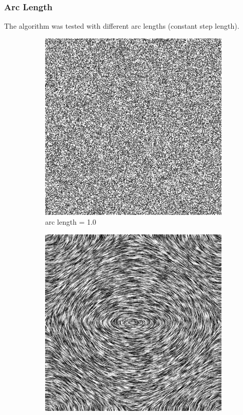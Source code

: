\documentclass{article}
\begin{document}
\subsubsection{Arc Length}
The algorithm was tested with different arc lengths (constant step length).
\begin{figure}[h!]
    \centering
    \begin{subfigure}{0.30\textwidth}
        \centering
        \includegraphics[width=\textwidth]{lic_metsim_arc_1.png}
        \caption{arc length = 1.0}
    \end{subfigure}
    \hfill
    \begin{subfigure}{0.30\textwidth}
        \centering
        \includegraphics[width=\textwidth]{lic_metsim_arc_8.png}

\end{subfigure}
\end{figure}
\end{document}

